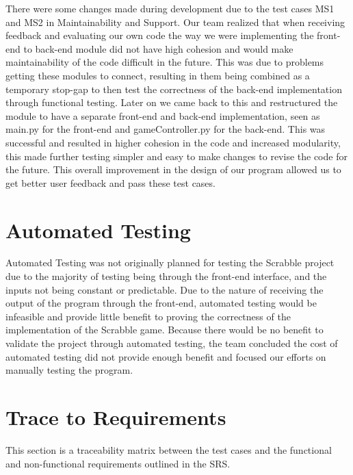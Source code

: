 \documentclass[12pt, titlepage]{article}
\begin{document}
There were some changes made during development due to the test cases MS1 and MS2 in Maintainability and Support. Our team realized that when receiving feedback and evaluating our own code the way we were implementing the front-end to back-end module did not have high cohesion and would make maintainability of the code difficult in the future. This was due to problems getting these modules to connect, resulting in them being combined as a temporary stop-gap to then test the correctness of the back-end implementation through functional testing. Later on we came back to this and restructured the module to have a separate front-end and back-end implementation, seen as main.py for the front-end and gameController.py for the back-end. This was successful and resulted in higher cohesion in the code and increased modularity, this made further testing simpler and easy to make changes to revise the code for the future. This overall improvement in the design of our program allowed us to get better user feedback and pass these test cases.

\section{Automated Testing}

Automated Testing was not originally planned for testing the Scrabble project due to the majority of testing being through the front-end interface, and the inputs not being constant or predictable. Due to the nature of receiving the output of the program through the front-end, automated testing would be infeasible and provide little benefit to proving the correctness of the implementation of the Scrabble game. Because there would be no benefit to validate the project through automated testing, the team concluded the cost of automated testing did not provide enough benefit and focused our efforts on manually testing the program.
		
\section{Trace to Requirements}

This section is a traceability matrix between the test cases and the functional and non-functional requirements outlined in the SRS.
\end{document}
